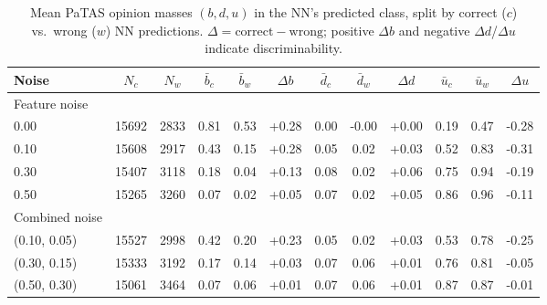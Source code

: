 \begin{table}[ht]
\centering
\caption{Mean \ac{PaTAS} opinion masses $(b, d, u)$ in the \ac{NN}'s predicted class, split by correct ($c$) vs.\ wrong ($w$) NN predictions. $\Delta = \text{correct} - \text{wrong}$; positive $\Delta b$ and negative $\Delta d$/$\Delta u$ indicate discriminability.}
\label{tab:ptas-effectiveness}
\begin{tabular}{lccccccccccc}
\toprule
Noise & $N_c$ & $N_w$ & $\bar{b}_c$ & $\bar{b}_w$ & $\Delta b$ & $\bar{d}_c$ & $\bar{d}_w$ & $\Delta d$ & $\bar{u}_c$ & $\bar{u}_w$ & $\Delta u$ \\
\hline
Feature noise \\
0.00 & 15692 & 2833 & 0.81 & 0.53 & +0.28 & 0.00 & -0.00 & +0.00 & 0.19 & 0.47 & -0.28 \\
0.10 & 15608 & 2917 & 0.43 & 0.15 & +0.28 & 0.05 & 0.02 & +0.03 & 0.52 & 0.83 & -0.31 \\
0.30 & 15407 & 3118 & 0.18 & 0.04 & +0.13 & 0.08 & 0.02 & +0.06 & 0.75 & 0.94 & -0.19\\
0.50 & 15265 & 3260 & 0.07 & 0.02 & +0.05 & 0.07 & 0.02 & +0.05 & 0.86 & 0.96 & -0.11 \\
\hline 
Combined noise \\
(0.10, 0.05) & 15527 & 2998 & 0.42 & 0.20 & +0.23 & 0.05 & 0.02 & +0.03 & 0.53 & 0.78 & -0.25 \\
(0.30, 0.15) & 15333 & 3192 & 0.17 & 0.14 & +0.03 & 0.07 & 0.06 & +0.01 & 0.76 & 0.81 & -0.05 \\
(0.50, 0.30) & 15061 & 3464 & 0.07 & 0.06 & +0.01 & 0.07 & 0.06 & +0.01 & 0.87 & 0.87 & -0.01 \\
\bottomrule
\end{tabular}
\end{table}